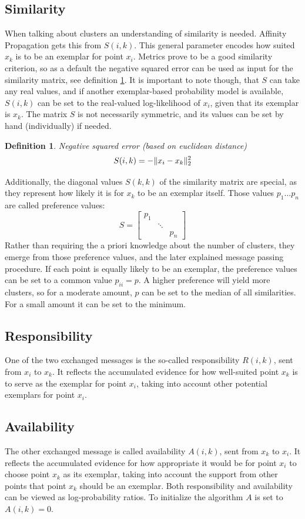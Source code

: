 \documentclass[11pt,a4paper]{article}
\newtheorem{definition}{Definition}
\DeclarePairedDelimiter\norm{\lVert}{\rVert}
\begin{document}
\subsection{Similarity}
When talking about clusters an understanding of similarity is needed. Affinity Propagation gets this from $S(i,k)$. This general parameter encodes how suited $x_k$ is to be an exemplar for point $x_i$. Metrics prove to be a good similarity criterion, so as a default the negative squared error can be used as input for the similarity matrix, see definition \ref{def:negsquared}. It is important to note though, that $S$ can take any real values, and if another exemplar-based probability model is available, $S(i,k)$ can be set to the real-valued log-likelihood of $x_i$, given that its exemplar is $x_k$. The matrix $S$ is not necessarily symmetric, and its values can be set by hand (individually) if needed.
\begin{definition}\label{def:negsquared}
	Negative squared error (based on euclidean distance)
	\[
		S(i,k) = - \norm{x_i - x_k}^{2}_{2}
	\]
\end{definition}
Additionally, the diagonal values $S(k,k)$ of the similarity matrix are special, as they represent how likely it is for $x_k$ to be an exemplar itself. Those values $p_1\dots p_n$ are called preference values:
\[
	S = \begin{bmatrix}p_{1} & & \\ & \ddots & \\ & & p_{n}\end{bmatrix}
\]
Rather than requiring the a priori knowledge about the number of clusters, they emerge from those preference values, and the later explained message passing procedure. If each point is equally likely to be an exemplar, the preference values can be set to a common value $p_{ii} = p$. A higher preference will yield more clusters, so for a moderate amount, $p$ can be set to the median of all similarities. For a small amount it can be set to the minimum.

\subsection{Responsibility} \label{sec:responsability}
One of the two exchanged messages is the so-called responsibility $R(i,k)$, sent from $x_i$ to $x_k$. It reflects the accumulated evidence for how well-suited point $x_k$ is to serve as the exemplar for point $x_i$, taking into account other potential exemplars for point $x_i$.
\subsection{Availability} \label{sec:availability}
The other exchanged message is called availability $A(i,k)$, sent from $x_k$ to $x_i$. It reflects the accumulated evidence for how appropriate it would be for point $x_i$ to choose point $x_k$ as its exemplar, taking into account the support from other points that point $x_k$ should be an exemplar. Both responsibility and availability can be viewed as log-probability ratios. To initialize the algorithm $A$ is set to $A(i,k) = 0$.
\end{document}
